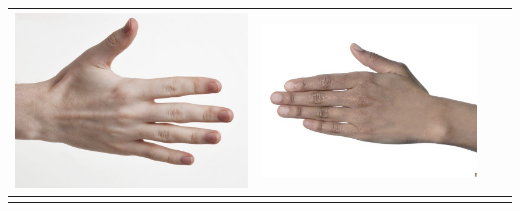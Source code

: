 \begin{longtable}{|N||c|c|c|}
\begin{minipage}{.29\textwidth}
    \includegraphics[width=\textwidth,height=\textheight,keepaspectratio]{../inputs/hand_pale.jpg}
  \end{minipage} & 
  \begin{minipage}{.29\textwidth}
    \includegraphics[width=\textwidth,height=\textheight,keepaspectratio]{../rc_test/outputs/20170516_proportional_test/hand_brown_to_hand_pale.jpg}
  \end{minipage} \\
\hline  \label{row:prop_test_hand_light_to_hand_dark} &
  \begin{minipage}{.29\textwidth}

\end{minipage}
\end{longtable}

